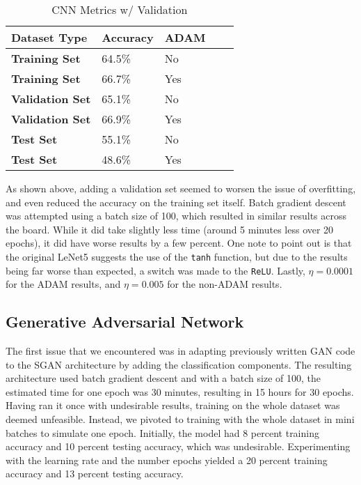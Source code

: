 \begin{table}[ht] 
    \centering
    \begin{tabular}{|l|l|l|l|l|}
        \hline
        \textbf{Dataset Type} & \textbf{Accuracy} & \textbf{ADAM}\\
        \hline
        \textbf{Training Set} & 64.5\% & No\\
        \textbf{Training Set} & 66.7\% & Yes\\
        \textbf{Validation Set} & 65.1\% & No\\
        \textbf{Validation Set} & 66.9\% & Yes\\
        \textbf{Test Set} & 55.1\% & No\\
        \textbf{Test Set} & 48.6\% & Yes\\
        \hline
    \end{tabular}
    \caption{CNN Metrics w/ Validation}
    \label{tab:Table3}
\end{table}

\newpage
\noindent As shown above, adding a validation set seemed to worsen the issue of overfitting, and even reduced the accuracy on the training set itself. Batch gradient descent was attempted using a batch size of 100, which resulted in similar results across the board. While it did take slightly less time (around 5 minutes less over 20 epochs), it did have worse results by a few percent. One note to point out is that the original LeNet5 suggests the use of the \verb|tanh| function, but due to the results being far worse than expected, a switch was made to the \verb|ReLU|. Lastly, $\eta = 0.0001$ for the ADAM results, and $\eta = 0.005$ for the non-ADAM results.

\subsection{Generative Adversarial Network}
\label{sec:evaluation:Generative Adversarial Network}

The first issue that we encountered was in adapting previously written GAN code to the SGAN architecture by adding the classification components. The resulting architecture used batch gradient descent and with a batch size of 100, the estimated time for one epoch was 30 minutes, resulting in 15 hours for 30 epochs. Having ran it once with undesirable results, training on the whole dataset was deemed unfeasible. Instead, we pivoted to training with the whole dataset in mini batches to simulate one epoch. Initially, the model had 8 percent training accuracy and 10 percent testing accuracy, which was undesirable. Experimenting with the learning rate and the number epochs yielded a 20 percent training accuracy and 13 percent testing accuracy. 